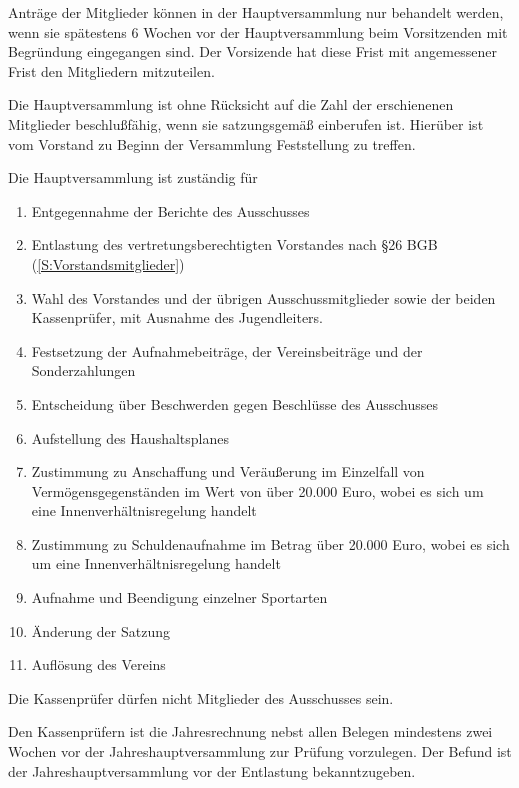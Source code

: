 \documentclass[10pt,a4paper,parskip=half]{scrartcl}
\begin{document}
\begin{contract}
    Anträge der Mitglieder können in der Haupt\-ver\-samm\-lung nur behandelt werden,
    wenn sie spätestens 6 Wochen vor der Hauptversammlung beim Vorsitzenden mit Begründung eingegangen sind.
    Der Vorsizende hat diese Frist mit angemessener Frist den Mitgliedern mitzuteilen.
    
    Die Hauptversammlung ist ohne Rücksicht auf die Zahl der erschienenen Mitglieder beschlußfähig,
    wenn sie satzungsgemäß einberufen ist.
    Hierüber ist vom Vorstand zu Beginn der Versammlung Feststellung zu treffen.
    
    Die Hauptversammlung ist zuständig für
    \begin{enumerate}[label=\alph*),noitemsep]
      \item Entgegennahme der Berichte des Ausschusses
      \item Entlastung des vertretungsberechtigten Vorstandes nach §26 BGB (\ref{S:Vorstandsmitglieder})
      \item Wahl des Vorstandes und der übrigen Ausschussmitglieder sowie der beiden Kassenprüfer,
            mit Ausnahme des Jugendleiters.
      \item Festsetzung der Aufnahmebeiträge,
            der Vereinsbeiträge und der Sonderzahlungen
      \item Entscheidung über Beschwerden gegen Beschlüsse des Ausschusses
      \item Aufstellung des Haushaltsplanes
      \item Zustimmung zu Anschaffung und Veräußerung im Einzelfall von Vermögensgegenständen im Wert von über 20.000 Euro,
            wobei es sich um eine Innenverhältnisregelung handelt
      \item Zustimmung zu Schuldenaufnahme im Betrag über 20.000 Euro,
            wobei es sich um eine Innenverhältnisregelung handelt
      \item Aufnahme und Beendigung einzelner Sportarten
      \item Änderung der Satzung
      \item Auflösung des Vereins
    \end{enumerate}
    
    Die Kassenprüfer dürfen nicht Mitglieder des Ausschusses sein.
    
    Den Kassenprüfern ist die Jahresrechnung nebst allen Belegen mindestens zwei Wochen vor der Jahreshauptversammlung zur Prüfung vorzulegen. 
    Der Befund ist der Jahreshauptversammlung vor der Entlastung bekanntzugeben.
    

\end{contract}
\end{document}
